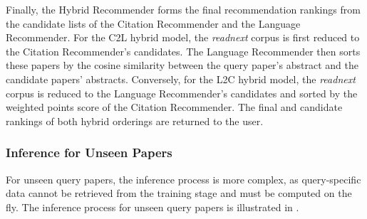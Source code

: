 Finally, the Hybrid Recommender forms the final recommendation rankings from the candidate lists of the Citation Recommender and the Language Recommender.
For the \ac{C2L} hybrid model, the \emph{readnext} corpus is first reduced to the Citation Recommender's candidates.
The Language Recommender then sorts these papers by the cosine similarity between the query paper's abstract and the candidate papers' abstracts.
Conversely, for the \ac{L2C} hybrid model, the \emph{readnext} corpus is reduced to the Language Recommender's candidates and sorted by the weighted points score of the Citation Recommender.
The final and candidate rankings of both hybrid orderings are returned to the user.


\subsubsection*{Inference for Unseen Papers}

For unseen query papers, the inference process is more complex, as query-specific data cannot be retrieved from the training stage and must be computed on the fly. The inference process for unseen query papers is illustrated in .

